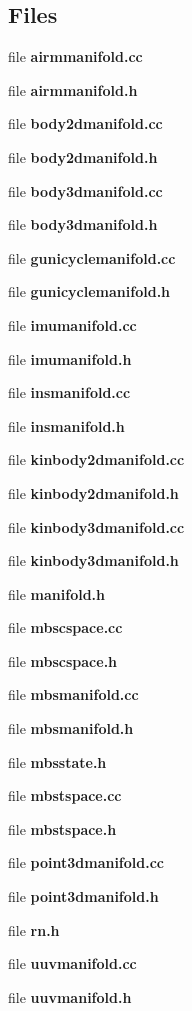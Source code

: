 \subsection*{\-Files}
\begin{DoxyCompactItemize}
\item 
file {\bf airmmanifold.\-cc}
\item 
file {\bf airmmanifold.\-h}
\item 
file {\bf body2dmanifold.\-cc}
\item 
file {\bf body2dmanifold.\-h}
\item 
file {\bf body3dmanifold.\-cc}
\item 
file {\bf body3dmanifold.\-h}
\item 
file {\bf gunicyclemanifold.\-cc}
\item 
file {\bf gunicyclemanifold.\-h}
\item 
file {\bf imumanifold.\-cc}
\item 
file {\bf imumanifold.\-h}
\item 
file {\bf insmanifold.\-cc}
\item 
file {\bf insmanifold.\-h}
\item 
file {\bf kinbody2dmanifold.\-cc}
\item 
file {\bf kinbody2dmanifold.\-h}
\item 
file {\bf kinbody3dmanifold.\-cc}
\item 
file {\bf kinbody3dmanifold.\-h}
\item 
file {\bf manifold.\-h}
\item 
file {\bf mbscspace.\-cc}
\item 
file {\bf mbscspace.\-h}
\item 
file {\bf mbsmanifold.\-cc}
\item 
file {\bf mbsmanifold.\-h}
\item 
file {\bf mbsstate.\-h}
\item 
file {\bf mbstspace.\-cc}
\item 
file {\bf mbstspace.\-h}
\item 
file {\bf point3dmanifold.\-cc}
\item 
file {\bf point3dmanifold.\-h}
\item 
file {\bf rn.\-h}
\item 
file {\bf uuvmanifold.\-cc}
\item 
file {\bf uuvmanifold.\-h}
\end{DoxyCompactItemize}

